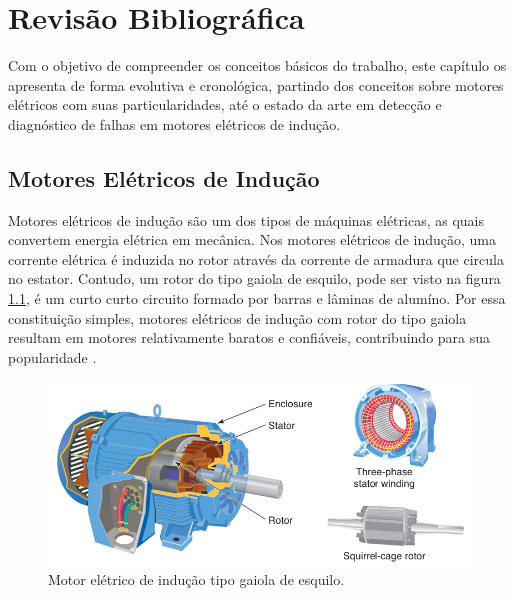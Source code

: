 
\chapter{Revisão Bibliográfica}

Com o objetivo de compreender os conceitos básicos do trabalho, este capítulo os apresenta de forma evolutiva e 
cronológica, partindo dos conceitos sobre motores elétricos com suas particularidades, até o estado da arte em 
detecção e diagnóstico de falhas em motores elétricos de indução. 


% 

\section{Motores Elétricos de Indução}\label{sec:}

Motores elétricos de indução são um dos tipos de máquinas elétricas, as quais convertem energia elétrica em mecânica. 
Nos motores elétricos de indução, uma corrente elétrica é induzida no rotor através da corrente de armadura que circula
no estator. Contudo, um rotor do tipo gaiola de esquilo, pode ser visto na figura \ref{fig:ind_motor_petruzella_p115}, 
é um curto curto circuito formado por barras e lâminas de alumíno. Por essa constituição simples, motores elétricos de indução
com rotor do tipo gaiola resultam em motores relativamente baratos e confiáveis, contribuindo para sua popularidade \cite{Umans2003}.
 
\begin{figure}[H]
    \caption{Motor elétrico de indução tipo gaiola de esquilo.}
    \begin{center}
        \includegraphics[scale=.5]{referencial/img/ind_motor_petruzella_p115.png}
    \end{center}
    \label{fig:ind_motor_petruzella_p115}
\end{figure}


